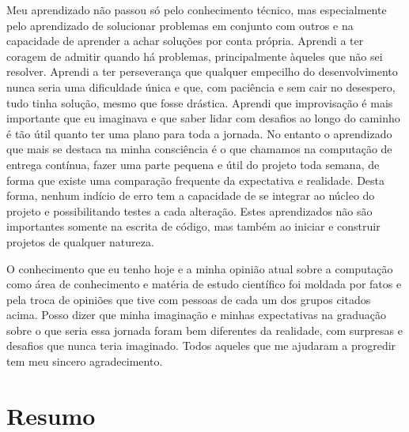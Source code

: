 \documentclass[11pt,twoside,a4paper]{book}
\begin{document}
 Meu aprendizado não passou só pelo conhecimento técnico, mas especialmente pelo aprendizado de solucionar problemas em conjunto com outros e na capacidade de aprender a achar soluções por conta própria. Aprendi a ter coragem de admitir quando há problemas, principalmente àqueles que não sei resolver. Aprendi a ter perseverança que qualquer empecilho do desenvolvimento nunca seria uma dificuldade única e que, com paciência e sem cair no desespero, tudo tinha solução, mesmo que fosse drástica. Aprendi que improvisação é mais importante que eu imaginava e que saber lidar com desafios ao longo do caminho é tão útil quanto ter uma plano para toda a jornada. No entanto o aprendizado que mais se destaca na minha consciência é o que chamamos na computação de entrega contínua, fazer uma parte pequena e útil do projeto toda semana, de forma que existe uma comparação frequente da expectativa e realidade. Desta forma, nenhum indício de erro tem a capacidade de se integrar ao núcleo do projeto e possibilitando testes a cada alteração. Estes aprendizados não são importantes somente na escrita de código, mas também ao iniciar e construir projetos de qualquer natureza. 
 
 O conhecimento que eu tenho hoje e a minha opinião atual sobre a computação como área de conhecimento e matéria de estudo científico foi moldada por fatos e pela troca de opiniões que tive com pessoas de cada um dos grupos citados acima. Posso dizer que minha imaginação e minhas expectativas na graduação sobre o que seria essa jornada foram bem diferentes da realidade, com surpresas e desafios que nunca teria imaginado. Todos aqueles que me ajudaram a progredir tem meu sincero agradecimento.


\chapter*{Resumo}
\end{document}
